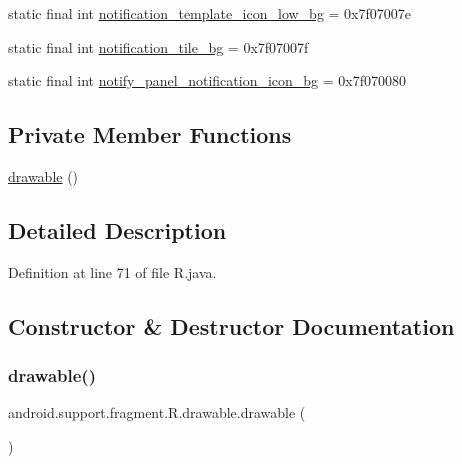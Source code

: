 \begin{DoxyCompactItemize}
\item 
static final int \mbox{\hyperlink{classandroid_1_1support_1_1fragment_1_1_r_1_1drawable_a66725999702b63cc02f2470d96c99744}{notification\+\_\+template\+\_\+icon\+\_\+low\+\_\+bg}} = 0x7f07007e
\item 
static final int \mbox{\hyperlink{classandroid_1_1support_1_1fragment_1_1_r_1_1drawable_a424a9574524ba829feba39ffb0d5f208}{notification\+\_\+tile\+\_\+bg}} = 0x7f07007f
\item 
static final int \mbox{\hyperlink{classandroid_1_1support_1_1fragment_1_1_r_1_1drawable_a5972fbc11817ad2e0cbb34f744075a95}{notify\+\_\+panel\+\_\+notification\+\_\+icon\+\_\+bg}} = 0x7f070080
\end{DoxyCompactItemize}
\subsection*{Private Member Functions}
\begin{DoxyCompactItemize}
\item 
\mbox{\hyperlink{classandroid_1_1support_1_1fragment_1_1_r_1_1drawable_ae1a38b5dbb89e8d567d465815a8b184d}{drawable}} ()
\end{DoxyCompactItemize}


\subsection{Detailed Description}


Definition at line 71 of file R.\+java.



\subsection{Constructor \& Destructor Documentation}
\mbox{\label{classandroid_1_1support_1_1fragment_1_1_r_1_1drawable_ae1a38b5dbb89e8d567d465815a8b184d}} 
\subsubsection{\texorpdfstring{drawable()}{drawable()}}
{\footnotesize\ttfamily android.\+support.\+fragment.\+R.\+drawable.\+drawable (\begin{DoxyParamCaption}{ }\end{DoxyParamCaption})\hspace{0.3cm}{\ttfamily [private]}}



